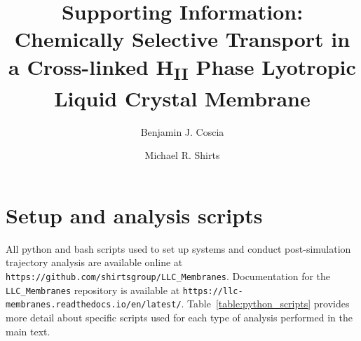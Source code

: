 \documentclass{article}
\title{Supporting Information: Chemically Selective Transport in a Cross-linked 
H\textsubscript{II} Phase Lyotropic Liquid Crystal Membrane}
\author{Benjamin J. Coscia \and Michael R. Shirts}
\begin{document}
  \maketitle
  \graphicspath{{./supporting_figures/}}
  

  \section{Setup and analysis scripts}\label{section:python_scripts}

  All python and bash scripts used to set up systems and conduct post-simulation trajectory
  analysis are available online at \texttt{https://github.com/shirtsgroup/LLC\_Membranes}.
  Documentation for the \texttt{LLC\_Membranes} repository is available at 
  \texttt{https://llc-membranes.readthedocs.io/en/latest/}. Table~\ref{table:python_scripts}
  provides more detail about specific scripts used for each type of analysis performed in
  the main text.
  
\end{document}
